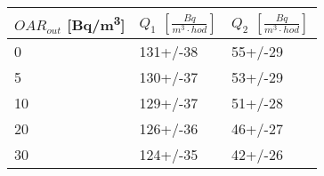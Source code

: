 \begin{tabular}{lll}
\toprule
$OAR_{out}$ [\si{Bq/m^3}] & $Q_1$ $\left[\si{\frac{Bq}{m^3\cdot hod}}\right]$ & $Q_2$ $\left[\si{\frac{Bq}{m^3\cdot hod}}\right]$ \\
\midrule
0  &                                          131+/-38 &                                           55+/-29 \\
5  &                                          130+/-37 &                                           53+/-29 \\
10 &                                          129+/-37 &                                           51+/-28 \\
20 &                                          126+/-36 &                                           46+/-27 \\
30 &                                          124+/-35 &                                           42+/-26 \\
\bottomrule
\end{tabular}
